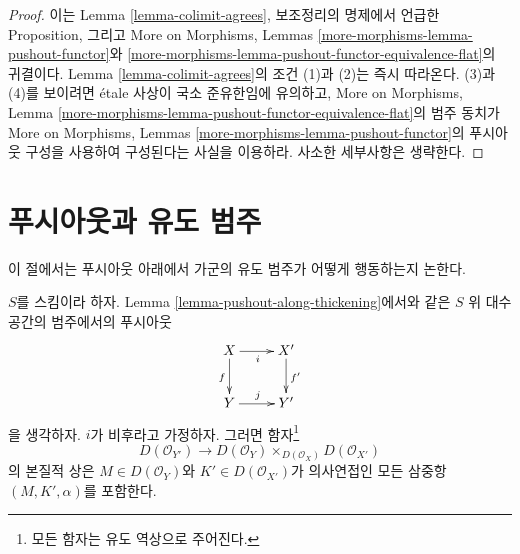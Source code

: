 \begin{proof}
이는 Lemma \ref{lemma-colimit-agrees}, 보조정리의 명제에서 언급한
Proposition, 그리고 More on Morphisms, Lemmas
\ref{more-morphisms-lemma-pushout-functor}와
\ref{more-morphisms-lemma-pushout-functor-equivalence-flat}의 귀결이다.
Lemma \ref{lemma-colimit-agrees}의 조건 (1)과 (2)는 즉시 따라온다.
(3)과 (4)를 보이려면 \'etale 사상이 국소 준유한임에 유의하고,
More on Morphisms, Lemma
\ref{more-morphisms-lemma-pushout-functor-equivalence-flat}의 범주 동치가
More on Morphisms, Lemmas
\ref{more-morphisms-lemma-pushout-functor}의 푸시아웃 구성을 사용하여
구성된다는 사실을 이용하라. 사소한 세부사항은 생략한다.
\end{proof}

\section{푸시아웃과 유도 범주}
\label{section-pushouts-derived}

\noindent
이 절에서는 푸시아웃 아래에서 가군의 유도 범주가 어떻게 행동하는지 논한다.

\begin{lemma}
\label{lemma-pushout-along-thickening-derived}
$S$를 스킴이라 하자. Lemma \ref{lemma-pushout-along-thickening}에서와 같은
$S$ 위 대수 공간의 범주에서의 푸시아웃
$$
\xymatrix{
X \ar[r]_i \ar[d]_f & X' \ar[d]^{f'}
\\
Y \ar[r]^j & Y'
}
$$
을 생각하자. $i$가 비후라고 가정하자. 그러면 함자\footnote{모든 함자는
유도 역상으로 주어진다.}
$$
D(\mathcal{O}_{Y'}) \longrightarrow
D(\mathcal{O}_Y) \times_{D(\mathcal{O}_X)} D(\mathcal{O}_{X'})
$$
의 본질적 상은 $M \in D(\mathcal{O}_Y)$와
$K' \in D(\mathcal{O}_{X'})$가 의사연접인 모든 삼중항
$(M, K', \alpha)$를 포함한다.
\end{lemma}

